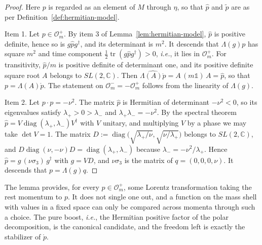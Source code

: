 \begin{proof}
	Here $p$ is regarded as an element of $M$ through $\eta$, so that $\hat{p}$ and $\tilde{p}$ are as per Definition~\ref{def:hermitian-model}.
	
	Item 1. Let $p\in\mathcal{O}_m^+$. By item 3 of Lemma~\ref{lem:hermitian-model}, $\hat{p}$ is positive definite, hence so is $g\hat{p}g^\dagger$, and its determinant is $m^2$. It descends that $\Lambda(g)p$ has square $m^2$ and time component $\tfrac12\operatorname{tr}(g\hat{p}g^\dagger)>0$, \textit{i.e.}, it lies in $\mathcal{O}_m^+$. For transitivity, $\hat{p}/m$ is positive definite of determinant one, and its positive definite square root $A$ belongs to $SL(2,\mathbb{C})$. Then $\widehat{\Lambda(A)\mathring{p}}=A\,(m\mathbb{1})\,A=\hat{p}$, so that $p=\Lambda(A)\mathring{p}$. The statement on $\mathcal{O}_m^-=-\mathcal{O}_m^+$ follows from the linearity of $\Lambda(g)$.
	
	Item 2. Let $p\cdot p=-\nu^2$. The matrix $\hat{p}$ is Hermitian of determinant $-\nu^2<0$, so its eigenvalues satisfy $\lambda_+>0>\lambda_-$ and $\lambda_+\lambda_-=-\nu^2$. By the spectral theorem $\hat{p}=V\operatorname{diag}(\lambda_+,\lambda_-)V^\dagger$ with $V$ unitary, and multiplying $V$ by a phase we may take $\det V=1$. The matrix $D:=\operatorname{diag}\big(\sqrt{\lambda_+/\nu},\sqrt{\nu/\lambda_+}\big)$ belongs to $SL(2,\mathbb{C})$, and $D\operatorname{diag}(\nu,-\nu)D=\operatorname{diag}(\lambda_+,\lambda_-)$ because $\lambda_-=-\nu^2/\lambda_+$. Hence $\hat{p}=g\,(\nu\sigma_3)\,g^\dagger$ with $g=VD$, and $\nu\sigma_3$ is the matrix of $q=(0,0,0,\nu)$. It descends that $p=\Lambda(g)q$.
\end{proof}

The lemma provides, for every $p\in\mathcal{O}_m^+$, some Lorentz transformation taking the rest momentum to $p$. It does not single one out, and a function on the mass shell with values in a fixed space can only be compared across momenta through such a choice. The pure boost, \textit{i.e.}, the Hermitian positive factor of the polar decomposition, is the canonical candidate, and the freedom left is exactly the stabilizer of $\mathring{p}$.

